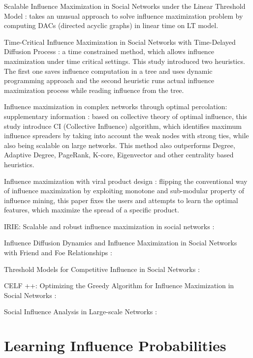 Scalable Influence Maximization in Social Networks under the Linear Threshold Model \cite{chen2010b}: takes an unusual approach to solve influence maximization problem by computing DACs (directed acyclic graphs) in linear time on LT model. 
	
Time-Critical Influence Maximization in Social Networks with Time-Delayed Diffusion Process \cite{chen2012}: a time constrained method, which allows influence maximization under time critical settings. This study introduced two heuristics. The first one saves influence computation in a tree and uses dynamic programming approach and the second heuristic runs actual influence maximization process while reading influence from the tree.
	
Influence maximization in complex networks through optimal percolation: supplementary information \cite{morone2015}: based on collective theory of optimal influence, this study introduce CI (Collective Influence) algorithm, which identifies maximum influence spreaders by taking into account the weak nodes with strong ties, while also being scalable on large networks. This method also outperforms Degree, Adaptive Degree, PageRank, K-core, Eigenvector and other centrality based heuristics.
	
Influence maximization with viral product design \cite{barbieri2014}: flipping the conventional way of influence maximization by exploiting monotone and sub-modular property of influence mining, this paper  fixes the users and attempts to learn the optimal features, which maximize the spread of a specific product.
	
IRIE: Scalable and robust influence maximization in social networks \cite{jung2012}: 

Influence Diffusion Dynamics and Influence Maximization in Social Networks with Friend and Foe Relationships \cite{li2013}: 

Threshold Models for Competitive Influence in Social Networks \cite{borodin2010}:

CELF ++: Optimizing the Greedy Algorithm for Influence Maximization in Social Networks \cite{goyal2011b}:

Social Influence Analysis in Large-scale Networks \cite{tang2009}:


\section*{Learning Influence Probabilities}

